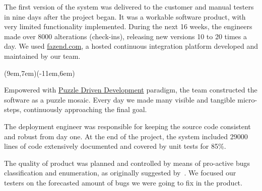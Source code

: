 \documentclass[12pt,letterpaper,oneside]{article}
\newcommand{\enru}[2]{#1}
\begin{document}
    \enru{
        The first version of the system was delivered to the customer
        and manual testers in nine days after the project began.
        It was a workable software product, with very limited
        functionality implemented. During the next 16 weeks, the engineers
        made over 8000 alterations (check-ins), releasing new
        versions 10 to 20 times a day.
        We used \href{http://www.fazend.com}{fazend.com},
        a hosted continuous integration platform developed and maintained by our team.
    }{
        Первая версия системы была представлена заказчику и тестерам
        на девятый день (!) после старта проекта. Это был полностью рабочий
        продукт, в ограниченной функциональностью. В течение следующих
        16-ти недель инженеры сделали более восьми тысяч изменений в этом продукте,
        выдавая новую версию 10-20 раз в день. Для автоматизации этого процесса мы использовали
        \href{http://www.fazend.com}{fazend.com} --- систему собственной разработки.
    }

    \parpic(9em,7em)(-11em,6em){}

    \enru{
        Empowered with \href{http://www.fazend.com/a/2010-03-PDD.html}{Puzzle Driven Development} paradigm,
        the team constructed the software as a puzzle mosaic. Every
        day we made many visible and tangible micro-steps,
        continuously approaching
        the final goal.
    }{
        Благодаря уникальной концепции \href{http://www.fazend.com/a/2010-03-PDD.html}{Puzzle Driven Development}
        команда создавала проект как мозаику. Каждый день
        мы делали видимый и ощутимый шаг вперед к конечной цели.
    }

    \enru{
        The deployment engineer was responsible for keeping the source code
        consistent and robust from day one. At the end of the
        project, the system included 29000 lines of code extensively
        documented and covered by unit tests for 85\%.
    }{
        Инженер по доставке был ответственен за целостность и качество
        исходного кода, начиная с первого дня проекта. В конце проекта
        мы получили 29 тысяч строк кода тщательно документированных и
        покрытых тестами на 85\% (!).
    }

    \enru{
        The quality of product was planned and controlled by means
        of pro-active bugs classification and enumeration, as originally suggested by~\citet{myers04}.
        We focused our testers on the forecasted amount of bugs we
        were going to fix in the product.
    }{
        Качество продукта планировалось и контролировалось при помощи
        активной классификации и нумерации дефектов, как предложил~\citet{myers04}.
        Мы ориентировали наших тестеров на ожидаемое число дефектов,
        которое требовалось обнаружить в продукте и затем устранить.
    }
\end{document}

